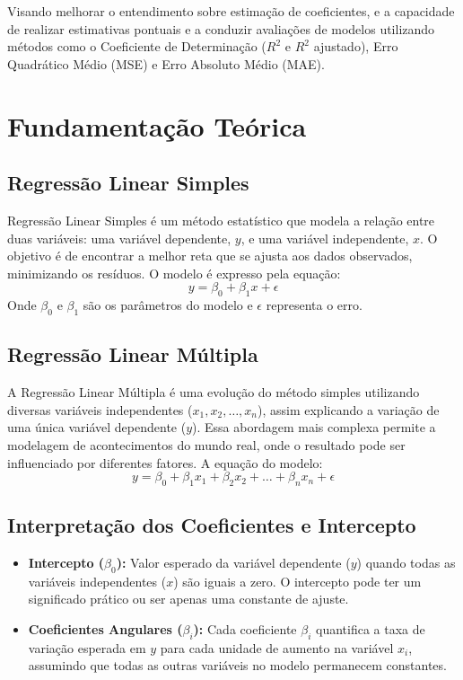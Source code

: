 \documentclass{article}
\begin{document}
Visando melhorar o entendimento sobre estimação de coeficientes, e a capacidade de realizar estimativas pontuais e a conduzir avaliações de modelos utilizando métodos como o Coeficiente de Determinação ($R^{2}$ e $R^{2}$ ajustado), Erro Quadrático Médio (MSE) e Erro Absoluto Médio (MAE).

\section{Fundamentação Teórica}
\subsection{Regressão Linear Simples}
Regressão Linear Simples é um método estatístico que modela a relação entre duas variáveis: uma variável dependente, $y$, e uma variável independente, $x$. O objetivo é de encontrar a melhor reta que se ajusta aos dados observados, minimizando os resíduos. O modelo é expresso pela equação:
\begin{equation}
    y = \beta_0 + \beta_1x + \epsilon
\end{equation}
Onde $\beta_0$ e $\beta_1$ são os parâmetros do modelo e $\epsilon$ representa o erro.

\subsection{Regressão Linear Múltipla}
A Regressão Linear Múltipla é uma evolução do método simples utilizando diversas variáveis independentes ($x_1, x_2, \dots, x_n$), assim explicando a variação de uma única variável dependente ($y$). Essa abordagem mais complexa permite a modelagem de acontecimentos do mundo real, onde o resultado pode ser influenciado por diferentes fatores. A equação do modelo:
\begin{equation}
    y = \beta_0 + \beta_1x_1 + \beta_2x_2 + \dots + \beta_nx_n + \epsilon
\end{equation}

\subsection{Interpretação dos Coeficientes e Intercepto}
\begin{itemize}
    \item \textbf{Intercepto ($\beta_0$):} Valor esperado da variável dependente ($y$) quando todas as variáveis independentes ($x$) são iguais a zero. O intercepto pode ter um significado prático ou ser apenas uma constante de ajuste.
    \item \textbf{Coeficientes Angulares ($\beta_i$):} Cada coeficiente $\beta_i$ quantifica a taxa de variação esperada em $y$ para cada unidade de aumento na variável $x_i$, assumindo que todas as outras variáveis no modelo permanecem constantes. 
\end{itemize}
\end{document}
